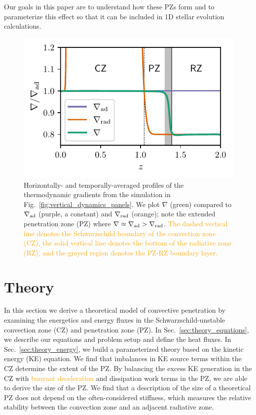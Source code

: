 \documentclass[twocolumn, linenumbers]{aastex631}
\newcommand{\gradrad}{\ensuremath{\nabla_{\rm{rad}}}}
\newcommand{\gradad}{\ensuremath{\nabla_{\rm{ad}}}}
\newcommand{\justgrad}{\ensuremath{\nabla}}
\newcommand{\editone}[1]{\textcolor{orange}{#1}}
\begin{document}
Our goals in this paper are to understand how these PZs form and to parameterize this effect so that it can be included in 1D stellar evolution calculations.

\begin{figure}[t]
\centering
\includegraphics[width=\columnwidth]{grad_profiles.pdf}
\caption{
Horizontally- and temporally-averaged profiles of the thermodynamic gradients from the simulation in Fig.~\ref{fig:vertical_dynamics_panels}.
We plot $\justgrad$ (green) compared to $\gradad$ (purple, a constant) and $\gradrad$ (orange); note the extended penetration zone (PZ) where $\justgrad \approx \gradad > \gradrad$.
    \editone{
        The dashed vertical line denotes the Schwarzschild boundary of the convection zone (CZ), the solid vertical line denotes the bottom of the radiative zone (RZ), and the greyed region denotes the PZ-RZ boundary layer.
    }
\label{fig:grad_profiles}
}
\end{figure}



\section{Theory}
\label{sec:theory}
In this section we derive a theoretical model of convective penetration by examining the energetics and energy fluxes in the Schwarzschild-unstable convection zone (CZ) and penetration zone (PZ).
In Sec.~\ref{sec:theory_equations}, we describe our equations and problem setup and define the heat fluxes.
In Sec.~\ref{sec:theory_energy}, we build a parameterized theory based on the kinetic energy (KE) equation.
We find that imbalances in KE source terms within the CZ determine the extent of the PZ.
By balancing the excess KE generation in the CZ with \editone{buoyant deceleration} and dissipation work terms in the PZ, we are able to derive the size of the PZ.
We find that a description of the size of a theoretical PZ does not depend on the often-considered stiffness, which measures the relative stability between the convection zone and an adjacent radiative zone.
\end{document}
